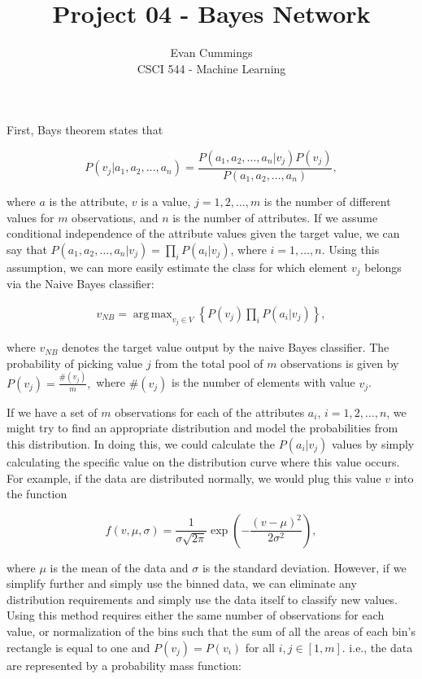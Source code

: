 
\DeclareMathOperator*{\argmax}{arg\,max}

\usepackage[top=.5in, bottom=.5in, left=.5in, right=.5in]{geometry}


\small

\title{Project 04 - Bayes Network}
\author{Evan Cummings\\
CSCI 544 - Machine Learning}

\maketitle

First, Bays theorem states that

$$ P(v_j | a_1, a_2, \ldots, a_n) = \frac{P(a_1, a_2, \ldots, a_n | v_j) P(v_j)}{P(a_1,a_2,\ldots,a_n)},$$

where $a$ is the attribute, $v$ is a value, $j = 1,2,\ldots,m$ is the number of different values for $m$ observations, and $n$ is the number of attributes.  If we assume conditional independence of the attribute values given the target value, we can say that $P(a_1, a_2, \ldots, a_n | v_j) = \prod_i P(a_i | v_j)$, where $i = 1,\ldots,n$.  Using this assumption, we can more easily estimate the class for which element $v_j$ belongs via the Naive Bayes classifier:

\begin{align}
  v_{NB} = \argmax_{v_j \in V}\left\{ P(v_j) \prod_i P(a_i | v_j) \right\},
\end{align}

where $v_{NB}$ denotes the target value output by the naive Bayes classifier.  The probability of picking value $j$ from the total pool of $m$ observations is given by $P(v_j) = \frac{\#(v_j)}{m},$ where $\#(v_j)$ is the number of elements with value $v_j$.

If we have a set of $m$ observations for each of the attributes $a_i$, $i = 1,2,\ldots,n$, we might try to find an appropriate distribution and model the probabilities from this distribution.  In doing this, we could calculate the $P(a_i | v_j)$ values by simply calculating the specific value on the distribution curve where this value occurs.  For example, if the data are distributed normally, we would plug this value $v$ into the function

$$f(v,\mu, \sigma) = \frac{1}{\sigma \sqrt{2\pi}} \exp\left( -\frac{(v-\mu)^2}{2\sigma^2} \right),$$

where $\mu$ is the mean of the data and $\sigma$ is the standard deviation.  However, if we simplify further and simply use the binned data, we can eliminate any distribution requirements and simply use the data itself to classify new values.  Using this method requires either the same number of observations for each value, or normalization of the bins such that the sum of all the areas of each bin's rectangle is equal to one and $P(v_j) = P(v_i)$ for all $i,j \in [1,m]$.  i.e., the data are represented by a probability mass function:

